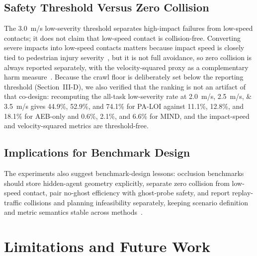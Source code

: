 \documentclass[journal]{IEEEtran}
\begin{document}
\subsection{Safety Threshold Versus Zero Collision}

The \SI{3.0}{m/s} low-severity threshold separates high-impact failures from low-speed contacts; it does not claim that low-speed contact is collision-free. Converting severe impacts into low-speed contacts matters because impact speed is closely tied to pedestrian injury severity~\cite{rosen2009fatality}, but it is not full avoidance, so zero collision is always reported separately, with the velocity-squared proxy as a complementary harm measure~\cite{westhofen2023criticality}. Because the crawl floor is deliberately set below the reporting threshold (Section~III-D), we also verified that the ranking is not an artifact of that co-design: recomputing the all-task low-severity rate at \SIlist{2.0;2.5;3.5}{m/s} gives 44.9\%, 52.9\%, and 74.1\% for PA-LOI against 11.1\%, 12.8\%, and 18.1\% for AEB-only and 0.6\%, 2.1\%, and 6.6\% for MIND, and the impact-speed and velocity-squared metrics are threshold-free.

\subsection{Implications for Benchmark Design}

The experiments also suggest benchmark-design lessons: occlusion benchmarks should store hidden-agent geometry explicitly, separate zero collision from low-speed contact, pair no-ghost efficiency with ghost-probe safety, and report replay-traffic collisions and planning infeasibility separately, keeping scenario definition and metric semantics stable across methods~\cite{althoff2017commonroad,karnchanachari2024nuplan,westhofen2023criticality}.

\section{Limitations and Future Work}
\end{document}
